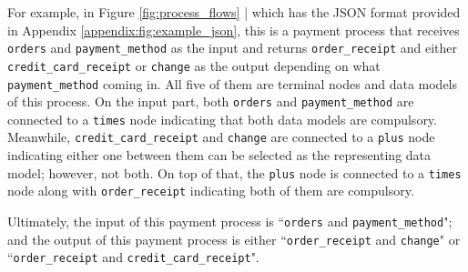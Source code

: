 For example, in Figure \ref{fig:process_flows} | which has the JSON format provided in Appendix \ref{appendix:fig:example_json}, this is a payment process that receives \verb!orders! and \verb!payment_method! as the input and returns \verb!order_receipt! and either \verb!credit_card_receipt! or \verb!change! as the output depending on what \verb!payment_method! coming in.
All five of them are terminal nodes and data models of this process. On the input part, both \verb!orders! and \verb!payment_method! are connected to a \verb!times! node indicating that both data models are compulsory. Meanwhile, \verb!credit_card_receipt! and \verb!change! are connected to a \verb!plus! node indicating either one between them can be selected as the representing data model; however, not both. On top of that, the \verb!plus! node is connected to a \verb!times! node along with \verb!order_receipt! indicating both of them are compulsory.

Ultimately, the input of this payment process is ``\verb!orders! and \verb!payment_method!"; and the output of this payment process is either ``\verb!order_receipt! and \verb!change!" or ``\verb!order_receipt! and \verb!credit_card_receipt!".





